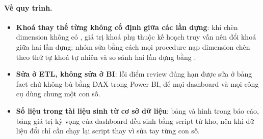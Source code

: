 \paragraph{Về quy trình.}
\begin{itemize}
  \item \textbf{Khoá thay thế từng không cố định giữa các lần dựng}: khi chèn dimension không có , giá trị khoá phụ thuộc kế hoạch truy vấn nên  đổi khoá giữa hai lần dựng; nhóm sửa bằng cách mọi procedure nạp dimension chèn theo thứ tự khoá tự nhiên và so sánh hai lần dựng bằng .
  \item \textbf{Sửa ở ETL, không sửa ở BI}: lỗi điểm review đúng hạn được sửa ở bảng fact chứ không bù bằng DAX trong Power BI, để mọi dashboard và mọi công cụ dùng chung một con số.
  \item \textbf{Số liệu trong tài liệu sinh từ cơ sở dữ liệu}: bảng và hình trong báo cáo, bảng giá trị kỳ vọng của dashboard đều sinh bằng script từ kho, nên khi dữ liệu đổi chỉ cần chạy lại script thay vì sửa tay từng con số.
\end{itemize}

